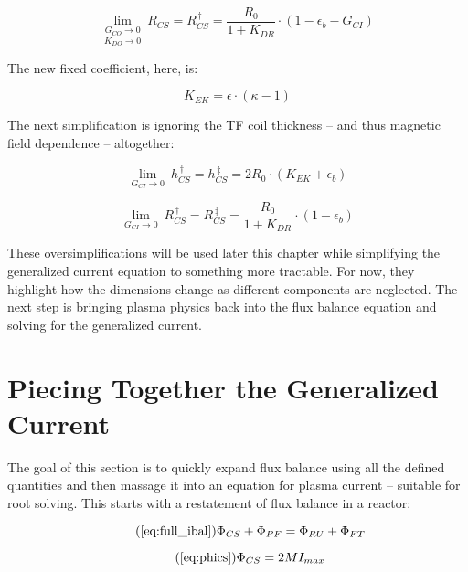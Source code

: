 \begin{equation}
	\underset{K_{DO} \to 0}{\underset{G_{CO} \to 0}{\lim}} \ R_{CS} = R_{CS}^{\,\dagger} = \frac{ R_0 }{ 1 + K_{DR} } \cdot \left( 1 - \epsilon_b - G_{CI}  \right)
\end{equation}

The new fixed coefficient, here, is:

\begin{equation}
	K_{EK} = \epsilon \cdot \left( \kappa - 1 \right)
\end{equation}

The next simplification is ignoring the TF coil thickness -- and thus magnetic field dependence -- altogether:

\begin{equation}
	\label{eq:hcs_simple}
	\underset{G_{CI} \to 0}{\lim} \ h_{CS}^{\,\dagger} = h_{CS}^{\,\ddagger} = 2 R_0 \cdot \left( K_{EK} + \epsilon_b \right) 
\end{equation}

\begin{equation}
	\label{eq:rcs_simple}
	\underset{G_{CI} \to 0}{\lim} \ R_{CS}^{\,\dagger} = R_{CS}^{\,\ddagger} = \frac{ R_0 }{ 1 + K_{DR} } \cdot \left( 1 - \epsilon_b  \right)
\end{equation}

These oversimplifications will be used later this chapter while simplifying the generalized current equation to something more tractable. For now, they highlight how the dimensions change as different components are neglected. The next step is bringing plasma physics back into the flux balance equation and solving for the generalized current.

\section{Piecing Together the Generalized Current}

The goal of this section is to quickly expand flux balance using all the defined quantities and then massage it into an equation for plasma current -- suitable for root solving. This starts with a restatement of flux balance in a reactor:

\begin{equation}
	\tag{\ref{eq:full_ibal}}
	\Phi_{CS} + \Phi_{PF} = \Phi_{RU} + \Phi_{FT}
\end{equation}

\begin{equation}
	\tag{\ref{eq:phics}}
	\Phi_{CS} = 2 M I_{max}
\end{equation}


